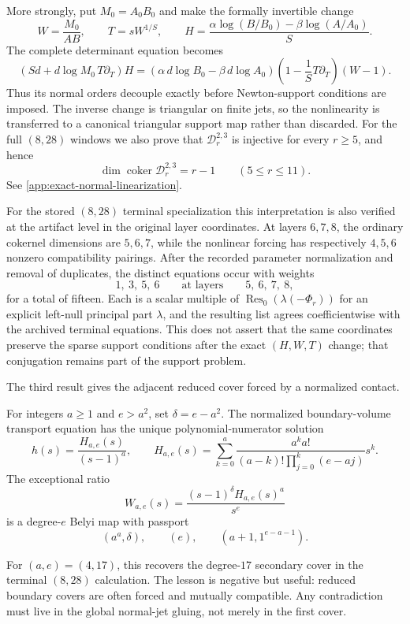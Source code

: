 \documentclass[11pt,reqno]{amsart}
\begin{document}
More strongly, put \(M_0=A_0B_0\) and make the formally invertible change
\[
W=\frac{M_0}{AB},\qquad
T=sW^{1/S},\qquad
H=\frac{\alpha\log(B/B_0)-\beta\log(A/A_0)}S.
\]
The complete determinant equation becomes
\[
\left(Sd+d\log M_0\,T\partial_T\right)H
=
\left(\alpha\,d\log B_0-\beta\,d\log A_0\right)
\left(1-\frac1S T\partial_T\right)(W-1).
\]
Thus its normal orders decouple exactly before Newton-support conditions
are imposed.  The inverse change is triangular on finite jets, so the
nonlinearity is transferred to a canonical triangular support map rather
than discarded.  For the full \((8,28)\) windows we also prove that
\(\mathscr D_r^{2,3}\) is injective for every \(r\ge5\), and hence
\[
\dim\operatorname{coker}\mathscr D_r^{2,3}=r-1
\qquad(5\le r\le11).
\]
See \cref{app:exact-normal-linearization}.

For the stored \((8,28)\) terminal specialization this interpretation is
also verified at the artifact level in the original layer coordinates.
At layers \(6,7,8\), the ordinary cokernel dimensions are \(5,6,7\), while
the nonlinear forcing has respectively \(4,5,6\) nonzero compatibility
pairings.  After the recorded parameter normalization and removal of
duplicates, the distinct equations occur with weights
\[
1,\ 3,\ 5,\ 6
\qquad\text{at layers}\qquad
5,\ 6,\ 7,\ 8,
\]
for a total of fifteen.  Each is a scalar multiple of
\(\operatorname{Res}_0(\lambda(-\Phi_r))\) for an explicit left-null
principal part \(\lambda\), and the resulting list agrees coefficientwise
with the archived terminal equations.  This does not assert that the same
coordinates preserve the sparse support conditions after the exact
\((H,W,T)\) change; that conjugation remains part of the support problem.

The third result gives the adjacent reduced cover forced by a normalized
contact.

\begin{theorem}
\label{thm:intro-secondary}
For integers \(a\ge1\) and \(e>a^2\), set \(\delta=e-a^2\).  The normalized
boundary-volume transport equation has the unique polynomial-numerator
solution
\[
h(s)=\frac{H_{a,e}(s)}{(s-1)^a},
\qquad
H_{a,e}(s)=
\sum_{k=0}^a
\frac{a^k a!}{(a-k)!\prod_{j=0}^k(e-aj)}s^k.
\]
The exceptional ratio
\[
W_{a,e}(s)=\frac{(s-1)^\delta H_{a,e}(s)^a}{s^e}
\]
is a degree-\(e\) Belyi map with passport
\[
(a^a,\delta),\qquad(e),\qquad(a+1,1^{e-a-1}).
\]
\end{theorem}

For \((a,e)=(4,17)\), this recovers the degree-\(17\) secondary cover in the
terminal \((8,28)\) calculation.  The lesson is negative but useful: reduced
boundary covers are often forced and mutually compatible.  Any contradiction
must live in the global normal-jet gluing, not merely in the first cover.
\end{document}
